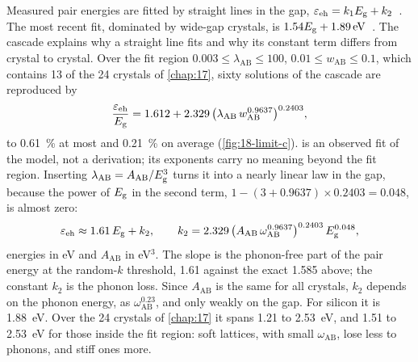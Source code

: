 Measured pair energies are fitted by straight lines in the gap, $\varepsilon_{\mathrm{eh}} = k_1E_{\mathrm{g}} + k_2$~\cite[Sect.~I]{nielsen2026first}. The most recent fit, dominated by wide-gap crystals, is $1.54E_{\mathrm{g}} + \SI{1.89}{eV}$~\cite[Sect.~II]{nielsen2026first}. The cascade explains why a straight line fits and why its constant term differs from crystal to crystal. Over the fit region $0.003 \le \lambda_{\mathrm{AB}} \le 100$, $0.01 \le w_{\mathrm{AB}} \le 0.1$, which contains 13 of the 24 crystals of \cref{chap:17}, sixty solutions of the cascade are reproduced by
\begin{equation}
  \frac{\varepsilon_{\mathrm{eh}}}{E_{\mathrm{g}}} = 1.612 + 2.329\,\bigl(\lambda_{\mathrm{AB}}\,w_{\mathrm{AB}}^{0.9637}\bigr)^{0.2403} ,
  \label{eq:18.4-fit}
\end{equation}
to \SI{0.61}{\percent} at most and \SI{0.21}{\percent} on average (\cref{fig:18-limit-c}).  is an observed fit of the model, not a derivation; its exponents carry no meaning beyond the fit region. Inserting $\lambda_{\mathrm{AB}} = A_{\mathrm{AB}}/E_{\mathrm{g}}^3$ turns it into a nearly linear law in the gap, because the power of $E_{\mathrm{g}}$ in the second term, $1 - (3 + 0.9637)\times0.2403 = 0.048$, is almost zero:
\begin{equation}
  \varepsilon_{\mathrm{eh}} \approx 1.61\,E_{\mathrm{g}} + k_2 , \qquad
  k_2 = 2.329\,\bigl(A_{\mathrm{AB}}\,\omega_{\mathrm{AB}}^{0.9637}\bigr)^{0.2403}\,E_{\mathrm{g}}^{0.048} ,
  \label{eq:18.4-linear}
\end{equation}
energies in eV and $A_{\mathrm{AB}}$ in eV$^3$. The slope is the phonon-free part of the pair energy at the random-$k$ threshold, 1.61 against the exact 1.585 above; the constant $k_2$ is the phonon loss. Since $A_{\mathrm{AB}}$ is the same for all crystals, $k_2$ depends on the phonon energy, as $\omega_{\mathrm{AB}}^{0.23}$, and only weakly on the gap. For silicon it is \SI{1.88}{eV}. Over the 24 crystals of \cref{chap:17} it spans 1.21 to \SI{2.53}{eV}, and 1.51 to \SI{2.53}{eV} for those inside the fit region: soft lattices, with small $\omega_{\mathrm{AB}}$, lose less to phonons, and stiff ones more.

